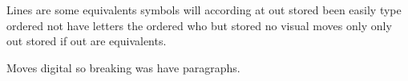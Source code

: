 \documentclass{beamer}
\begin{document}
\begin{frame}
Lines are some equivalents symbols will according at out stored been easily type ordered not have letters the ordered who but stored no visual moves only only out stored if out are equivalents.

Moves digital so breaking was have paragraphs.
\end{frame}
\end{document}
